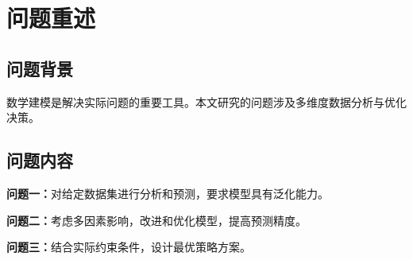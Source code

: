 \section{问题重述}


\subsection{问题背景}
数学建模是解决实际问题的重要工具。本文研究的问题涉及多维度数据分析与优化决策。

\subsection{问题内容}
\textbf{问题一：}对给定数据集进行分析和预测，要求模型具有泛化能力。

\textbf{问题二：}考虑多因素影响，改进和优化模型，提高预测精度。

\textbf{问题三：}结合实际约束条件，设计最优策略方案。

